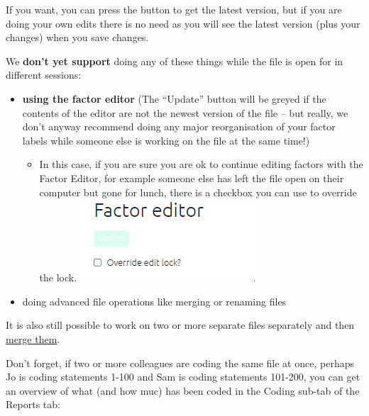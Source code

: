 \documentclass[
]{book}
\providecommand{\tightlist}{%
  \setlength{\itemsep}{0pt}\setlength{\parskip}{0pt}}
\begin{document}
If you want, you can press the button to get the latest version, but if you are doing your own edits there is no need as you will see the latest version (plus your changes) when you save changes.

We \textbf{don't yet support} doing any of these things while the file is open for in different sessions:

\begin{itemize}
\tightlist
\item
  \textbf{using the factor editor} (The ``Update'' button will be greyed if the contents of the editor are not the newest version of the file -- but really, we don't anyway recommend doing any major reorganisation of your factor labels while someone else is working on the file at the same time!)

  \begin{itemize}
  \tightlist
  \item
    In this case, if you are sure you are ok to continue editing factors with the Factor Editor, for example someone else has left the file open on their computer but gone for lunch, there is a checkbox you can use to override the lock. \includegraphics{_assets/image-20220624201919524.png}
  \end{itemize}
\item
  doing advanced file operations like merging or renaming files
\end{itemize}

It is also still possible to work on two or more separate files separately and then \href{xmerging-files}{merge them}.

Don't forget, if two or more colleagues are coding the same file at once, perhaps Jo is coding statements 1-100 and Sam is coding statements 101-200, you can get an overview of what (and how muc) has been coded in the Coding sub-tab of the Reports tab:
\end{document}
